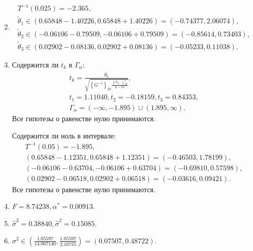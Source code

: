 \documentclass[a4paper,12pt]{article}
\newcommand{\norm}[1]{\left \| #1 \right \|}
\newcommand{\pro}[2]{#1_{\mathcal{#2}^\perp}}
\newcommand{\element}[1]{\left \{ #1 \right \}}
\begin{document}
\begin{enumerate}
\begin{gather*}
              \end{gather*}
        \item
              \begin{gather*}
                  T^{-1}(0.025) = -2.365, \\
                  \widetilde{\theta}_1 \in (0.65848 - 1.40226, 0.65848 + 1.40226) = (-0.74377, 2.06074) , \\
                  \widetilde{\theta}_2 \in (-0.06106 - 0.79509, -0.06106 + 0.79509) = (-0.85614, 0.73403) , \\
                  \widetilde{\theta}_3 \in (0.02902 - 0.08136, 0.02902 + 0.08136) = (-0.05233, 0.11038) .
              \end{gather*}

        \item
              Содержится ли $t_k$ в $\Gamma_\alpha$:
              \begin{gather*}
                  t_k = \frac{\widehat{\theta}_k}{\sqrt{\element{G^{-1}}_{kk} \frac{\norm{\pro{\eta}{L}}_W^2}{n-m}}} , \\
                  t_1 = 1.11040, t_2 = -0.18159, t_3 = 0.84353 , \\
                  \Gamma_\alpha = (-\infty, -1.895) \cup (1.895, \infty) .
              \end{gather*}
              Все гипотезы о равенстве нулю принимаются.

              Содержится ли ноль в интервале:
              \begin{gather*}
                  T^{-1}(0.05) = -1.895, \\
                  (0.65848 - 1.12351, 0.65848 + 1.12351) = (-0.46503, 1.78199) , \\
                  (-0.06106 - 0.63704, -0.06106 + 0.63704) = (-0.69810, 0.57598) , \\
                  (0.02902 - 0.06518, 0.02902 + 0.06518) = (-0.03616, 0.09421) .
              \end{gather*}
              Все гипотезы о равенстве нулю принимаются.

        \item $F = 8.74238, \alpha^* = 0.00913$.

        \item $\widehat{\sigma}^2 = 0.38840 , \widehat{\sigma}^2 = 0.15085$.

        \item $\sigma^2 \in \left( \frac{1.05597}{14.067140}, \frac{1.05597}{2.16735} \right ) = (0.07507, 0.48722)$.
    \end{enumerate}
\fi
\end{document}
